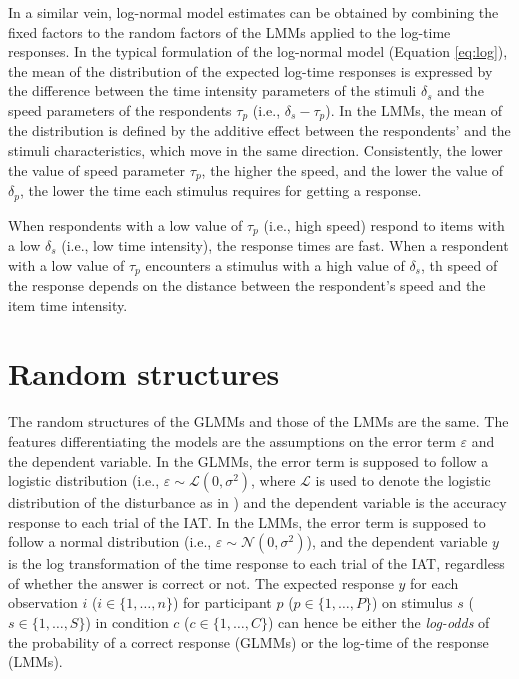 \documentclass[12pt]{book}
\begin{document}
In a similar vein, log-normal model estimates can be obtained by combining the fixed factors to the random factors of the LMMs applied to the log-time responses.  
In the typical formulation of the log-normal model (Equation \ref{eq:log}), the mean of the distribution of the expected log-time responses is expressed by the difference between the time intensity parameters of the stimuli $\delta_s$ and the speed parameters of the respondents $\tau_p$ (i.e., $\delta_s - \tau_{p}$). 
In the LMMs, the mean of the distribution is defined by the additive effect between the respondents' and the stimuli characteristics, which move in the same direction. Consistently, the lower the value of speed parameter $\tau_p$, the  higher the speed, and the lower the value of $\delta_p$, the lower the time each stimulus requires for getting a response. 

When respondents with a low value of $\tau_p$ (i.e., high speed) respond to items with a low $\delta_s$ (i.e., low time intensity), the response times are fast. 
When a respondent with a low value of $\tau_p$ encounters a stimulus with a high value of $\delta_s$, th speed of the response depends on the distance between the respondent's speed and the item time intensity.

\section{Random structures}\label{sec:random}
The random structures of the GLMMs and those of the LMMs are the same. The features differentiating the models are the assumptions on the error term $\varepsilon$ and the dependent variable. 
In the GLMMs, the error term is supposed to follow a logistic distribution (i.e., $\varepsilon \sim \mathcal{L}(0, \sigma^2)$, where $\mathcal{L}$ is used to denote the logistic distribution of the disturbance as in ) and the dependent variable is the accuracy response to each trial of the IAT. 
In the LMMs, the error term is supposed to follow a normal distribution (i.e., $\varepsilon \sim \mathcal{N}(0, \sigma^2)$), and the dependent variable $y$ is the log transformation of the time response to each trial of the IAT, regardless of whether the answer is correct or not.
The expected response $y$ for each observation $i$ ($i \in \{1, \ldots, n\}$)  for participant $p$ ($p \in \{1,\ldots, P\}$) on stimulus $s$ ($s \in \{1,\ldots, S\}$) in condition $c$ ($c\in \{1,\ldots, C\}$) can hence be either the \emph{log-odds} of the probability of a correct response (GLMMs) or the log-time of the response (LMMs).
\end{document}
